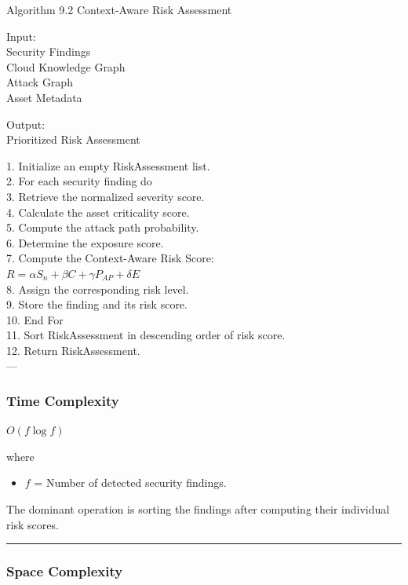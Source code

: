 Algorithm 9.2 Context-Aware Risk Assessment

Input:\\
Security Findings\\
Cloud Knowledge Graph\\
Attack Graph\\
Asset Metadata

Output:\\
Prioritized Risk Assessment

1. Initialize an empty RiskAssessment list.\\
2. For each security finding do\\
3. Retrieve the normalized severity score.\\
4. Calculate the asset criticality score.\\
5. Compute the attack path probability.\\
6. Determine the exposure score.\\
7. Compute the Context-Aware Risk Score:\\
$R = \alpha S_n + \beta C + \gamma P_{AP} + \delta E$\\
8. Assign the corresponding risk level.\\
9. Store the finding and its risk score.\\
10. End For\\
11. Sort RiskAssessment in descending order of risk score.\\
12. Return RiskAssessment.\\
---

\subsubsection{Time Complexity}

$O(f \log f)$

where

\begin{itemize}
\tightlist
\item
$f$ = Number of detected security findings.
\end{itemize}

The dominant operation is sorting the findings after computing their individual risk scores.

\begin{center}\rule{0.5\linewidth}{0.5pt}\end{center}

\subsubsection{Space Complexity}

